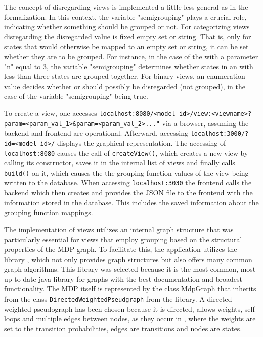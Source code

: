 \documentclass[preview]{standalone}
\begin{document}
The concept of disregarding views is implemented a little less general as in the formalization. In this context, the variable "semigrouping" plays a crucial role, indicating whether something should be grouped or not. For categorizing views disregarding the disregarded value is fixed empty set or string. That is, only for states that would otherwise be mapped to an empty set or string, it can be set whether they are to be grouped. For instance, in the case of the \viewN \viewscc with a parameter "n" equal to 3, the variable "semigrouping" determines whether states in an \sccN with less than three states are grouped together. For binary views, an enumeration value decides whether \hasppty or \notppty should possibly be disregarded (not grouped), in the case of the variable "semigrouping" being true.

To create a view, one accesses \nolinkurl{localhost:8080/<model\_id>/view:<viewname>?param=<param\_val\_1>\&param=<param\_val\_2>..."} via a browser, assuming the backend and frontend are operational. Afterward, accessing \nolinkurl{localhost:3000/?id=<model\_id>/} displays the graphical \viewN representation. The accessing of \nolinkurl{localhost:8080} causes the call of \texttt{createView()}, which creates a new view by calling its constructor, saves it in the internal list of views and finally calls \texttt{build()} on it, which causes the the grouping function values of the view being written to the database. When accessing \nolinkurl{localhost:3030} the frontend calls the backend which then creates and provides the JSON file to the frontend with the information stored in the database. This includes the saved information about the grouping function mappings.

The implementation of views utilizes an internal graph structure that was particularly essential for views that employ grouping based on the structural properties of the MDP graph. To facilitate this, the application utilizes the \jgrapht library \cite{Michail2020}, which not only provides graph structures but also offers many common graph algorithms. This library was selected because it is the most common, most up to date java library for graphs with the best documentation and broadest functionality. The MDP itself is represented by the class MdpGraph that inherits from the class \texttt{DirectedWeightedPseudgraph} from the \jgrapht library. A directed weighted pseudograph has been chosen because it is directed, allows weights, self loops and multiple edges between nodes, as they occur in \chgphsN, where the weights are set to the transition probabilities, edges are transitions and nodes are states.
\end{document}
